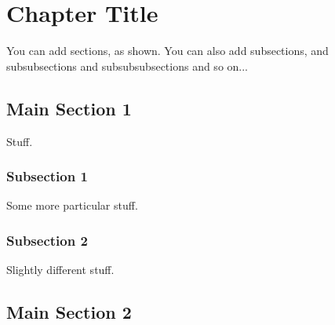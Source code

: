 
\chapter{Chapter Title} 

\label{ChapterX} 


You can add sections, as shown. You can also add subsections, and subsubsections and subsubsubsections and so on...

\section{Main Section 1}

Stuff. 

\subsection{Subsection 1}

Some more particular stuff.

\subsection{Subsection 2}

Slightly different stuff.

\section{Main Section 2}
